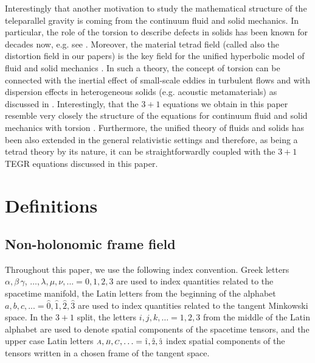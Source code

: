 \documentclass[
10pt, %
a4paper, %
oneside, %
twocolumn,
headinclude,footinclude, %
BCOR5mm, %
]{scrartcl}
\newcommand{\sA}{\mathsmaller A}
\newcommand{\sB}{\mathsmaller B}
\newcommand{\sC}{\mathsmaller C}
\newcommand{\indalg}[1]{\hat{\mathsmaller{#1}}}
\begin{document}
	
	Interestingly that another motivation to study the mathematical structure of
	the teleparallel gravity is coming from the continuum fluid and solid
	mechanics. In particular, the role of the torsion to describe defects in
	solids has been known for decades now, e.g. see
	\cite{VolovichKatanaev1992,Hehl2007,Yavari2012,NguyenLeMarrec2022,Bohmer2020,Lychev2022}.
	Moreover, the material tetrad field (called also the distortion field in our
	papers) is the key field for the unified hyperbolic model of fluid and solid
	mechanics \cite{HPR2016,DPRZ2016}. In such a theory, the concept of torsion
	can be connected with the inertial effect of small-scale eddies in turbulent
	flows and with dispersion effects in heterogeneous solids (e.g. acoustic
	metamaterials) as discussed in \cite{Torsion2019}. Interestingly, that the $
	3+1 $ equations we obtain in this paper resemble very closely the structure
	of the equations for continuum fluid and solid mechanics with torsion
	\cite{Torsion2019}. Furthermore, the unified theory of fluids and solids has
	been also extended in the general relativistic settings \cite{PTRSA2020} and
	therefore, as being a tetrad theory by its nature, it can be
	straightforwardly coupled with the $ 3+1 $ TEGR equations discussed in this
	paper.
	
	\section{Definitions}
	
	\subsection{Non-holonomic frame field}
	
	Throughout this paper, we use the following index convention. Greek letters $ \alpha, 
	\beta\,\gamma$, 
	$\ldots, \lambda,\mu,\nu,... 
	=0,1,2,3
	$ are used to index quantities related to the spacetime manifold, the Latin letters from the 
	beginning of the alphabet $ a,b,c,... 
	=\hat{0},\hat{1},\hat{2},\hat{3}$ are used to index quantities related to the tangent Minkowski 
	space.
	In the $ 3+1 $ split, the letters $ i,j,k,\ldots =1,2,3$ from the middle of the Latin alphabet 
	are 
	used 
	to denote spatial components of the spacetime tensors, and the upper case Latin letters $ 
	\sA,\sB,\sC,\ldots=\indalg{1},\indalg{2},\indalg{3} $ index spatial components of the tensors 
	written in a chosen frame of the 
	tangent space.
	
	
	
\end{document}
